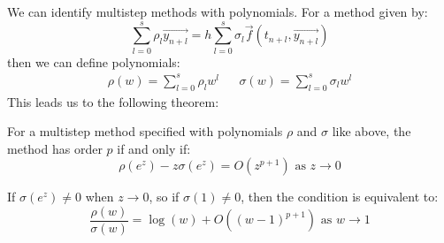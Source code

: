 \documentclass[../Main.tex]{subfiles}
\begin{document}
We can identify multistep methods with polynomials. For a method given by:
\begin{equation*}
    \sum_{l=0}^{s} \rho_l \vec{y_{n + l}} = h\sum_{l=0}^{s} \sigma_l \vec{f}(t_{n + l}, \vec{y_{n + l}})
\end{equation*}
then we can define polynomials:
\begin{align*}
    \rho(w) = \sum_{l=0}^{s} \rho_l w^l && \sigma(w) = \sum_{l=0}^{s} \sigma_l w^l
\end{align*}
This leads us to the following theorem:
\begin{theorem}
    For a multistep method specified with polynomials $\rho$ and $\sigma$ like above, the method has order $p$ if and only if:
    \begin{equation*}
        \rho(e^z) - z\sigma(e^z) = O(z^{p+1}) \text{ as } z \to 0
    \end{equation*}
    \label{thmODEMethodOrderExp}
\end{theorem}
\begin{remark}
    If $\sigma(e^z) \neq 0$ when $z \to 0$, so if $\sigma(1) \neq 0$, then the condition is equivalent to:
    \begin{equation*}
        \frac{\rho(w)}{\sigma(w)} = \log(w) + O\left((w-1)^{p+1}\right) \text{ as } w \to 1
    \end{equation*}
\end{remark}
\end{document}
